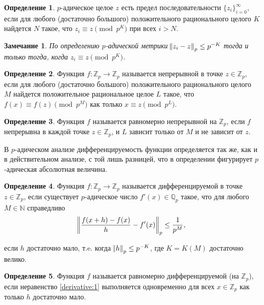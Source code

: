 \documentclass[master, och, diploma, times]{sty/SCWorks}
\theoremstyle{plain}
\newtheorem{note}{Замечание}[section]
\theoremstyle{definition}
\newtheorem{defn}{Определение}[section]
\numberwithin{equation}{section}
\begin{document}
\begin{defn}
$p$-адическое целое $z$ есть предел последовательности $\{z_i\}^{\infty}_{i=0}$, если для любого (достаточно большого) положительного рационального целого $K$ найдется $N$ такое, что ${z_i \equiv z \pmod p^K}$ при всех $i>N$. \cite{bib:analysis:anashin}
\end{defn}

\begin{note}
По определению $p$-адической метрики $\norm{z_i-z}_p \le p^{-K}$ тогда и только тогда, когда $z_i \equiv z \pmod p^K$. \cite{bib:analisys:khrennikov:1}
\end{note}

\begin{defn}
Функция $f:\mathbb {Z}_p \rightarrow \mathbb {Z}_p$ называется непрерывной в точке $z \in \mathbb {Z}_p$, если для любого (достаточно большого) положительного рационального целого $M$ найдется положительное рациональное целое $L$ такое, что ${f(x) \equiv f(z) \pmod p^M}$ как только $x \equiv z \pmod{p^L}$. \cite{bib:analysis:anashin:2}
\end{defn}

\begin{defn}
Функция $f$ называется равномерно непрерывной на $\mathbb {Z}_p$, если $f$ непрерывна в каждой точке $z \in \mathbb {Z}_p$, и $L$ зависит только от $M$ и не зависит от $z$.\cite{bib:analysis:ciocan}
\end{defn}

В $p$-адическом анализе дифференцируемость функции определяется так же, как и в действительном анализе, с той лишь разницей, что в определении фигурирует $p$-адическая абсолютная величина.

\begin{defn}
Функция $f:\mathbb {Z}_p \rightarrow \mathbb {Z}_p$ называется дифференцируемой в точке $z \in \mathbb {Z}_p$, если существует $p$-адическое число $f'(x) \in \mathbb {Q}_p$ такое, что для любого $M \in \mathbb {N}$ справедливо
\begin{equation} \label{derivative:1}
	\norm{\frac{f(x+h)-f(x)}{h} - f'(x)}_p \le \frac{1}{p^M},
\end{equation}

\noindent если $h$ достаточно мало, т.e. когда $\norm{h}_p \le p^{-K}$, где $K=K(M)$ достаточно велико.
\end{defn}

\begin{defn}
Функция $f$ называется равномерно дифференцируемой (на $\mathbb {Z}_p$), если неравенство \eqref{derivative:1} выполняется одновременно для всех $x \in \mathbb {Z}_p$ как только $h$ достаточно мало. \cite{bib:analysis:anashin:en}
\end{defn}
\end{document}
